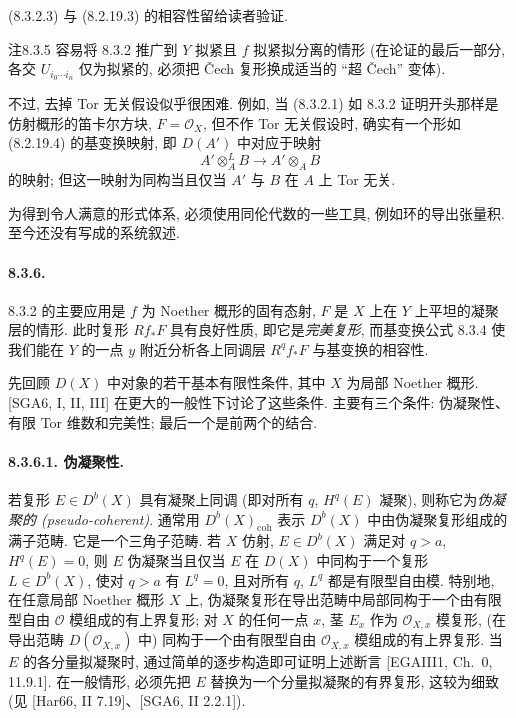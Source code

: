 (8.3.2.3) 与 (8.2.19.3) 的相容性留给读者验证.

\begin{origstatement}{注}{8.3.5}\label{ch08:rem835}
容易将 8.3.2 推广到 $Y$ 拟紧且 $f$ 拟紧拟分离的情形 (在论证的最后一部分, 各交 $U_{i_0\cdots i_n}$ 仅为拟紧的, 必须把 Čech 复形换成适当的 ``超 Čech'' 变体).

不过, 去掉 Tor 无关假设似乎很困难. 例如, 当 (8.3.2.1) 如 8.3.2 证明开头那样是仿射概形的笛卡尔方块, $F=\mathcal O_X$, 但不作 Tor 无关假设时, 确实有一个形如 (8.2.19.4) 的基变换映射, 即 $D(A')$ 中对应于映射
\[A'\otimes_A^LB\longrightarrow A'\otimes_AB\]
的映射; 但这一映射为同构当且仅当 $A'$ 与 $B$ 在 $A$ 上 Tor 无关.

为得到令人满意的形式体系, 必须使用同伦代数的一些工具, 例如环的导出张量积. 至今还没有写成的系统叙述.
\end{origstatement}

\paragraph{8.3.6.}
8.3.2 的主要应用是 $f$ 为 Noether 概形的固有态射, $F$ 是 $X$ 上在 $Y$ 上平坦的凝聚层的情形. 此时复形 $Rf_*F$ 具有良好性质, 即它是\emph{完美复形}, 而基变换公式 8.3.4 使我们能在 $Y$ 的一点 $y$ 附近分析各上同调层 $R^qf_*F$ 与基变换的相容性.

先回顾 $D(X)$ 中对象的若干基本有限性条件, 其中 $X$ 为局部 Noether 概形. [SGA6, I, II, III] 在更大的一般性下讨论了这些条件.
主要有三个条件: 伪凝聚性、有限 Tor 维数和完美性; 最后一个是前两个的结合.

\paragraph{8.3.6.1. 伪凝聚性.}
若复形 $E\in D^b(X)$ 具有凝聚上同调 (即对所有 $q$, $H^q(E)$ 凝聚), 则称它为\emph{伪凝聚的 (pseudo-coherent)}. 通常用 $D^b(X)_{\mathrm{coh}}$ 表示 $D^b(X)$ 中由伪凝聚复形组成的满子范畴. 它是一个三角子范畴. 若 $X$ 仿射, $E\in D^b(X)$ 满足对 $q>a$, $H^q(E)=0$, 则 $E$ 伪凝聚当且仅当 $E$ 在 $D(X)$ 中同构于一个复形 $L\in D^b(X)$, 使对 $q>a$ 有 $L^q=0$, 且对所有 $q$, $L^q$ 都是有限型自由模. 特别地, 在任意局部 Noether 概形 $X$ 上, 伪凝聚复形在导出范畴中局部同构于一个由有限型自由 $\mathcal O$ 模组成的有上界复形; 对 $X$ 的任何一点 $x$, 茎 $E_x$ 作为 $\mathcal O_{X,x}$ 模复形, (在导出范畴 $D(\mathcal O_{X,x})$ 中) 同构于一个由有限型自由 $\mathcal O_{X,x}$ 模组成的有上界复形.
当 $E$ 的各分量拟凝聚时, 通过简单的逐步构造即可证明上述断言 [EGAIII1, Ch.~0, 11.9.1]. 在一般情形, 必须先把 $E$ 替换为一个分量拟凝聚的有界复形, 这较为细致 (见 [Har66, II 7.19]、[SGA6, II 2.2.1]).


